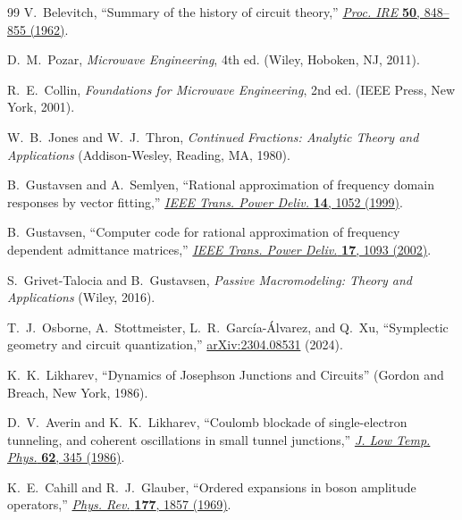 \documentclass[reprint, floatfix, superscriptaddress, amsmath, amssymb, longbibliography]{revtex4-2}
\begin{document}
\begin{thebibliography}{99}
V.~Belevitch,
``Summary of the history of circuit theory,''
\href{https://doi.org/10.1109/PROC.1962.1476}{\textit{Proc. IRE} \textbf{50}, 848--855 (1962)}.

D.~M.~Pozar,
\textit{Microwave Engineering}, 4th ed.
(Wiley, Hoboken, NJ, 2011).

R.~E.~Collin,
\textit{Foundations for Microwave Engineering}, 2nd ed.
(IEEE Press, New York, 2001).

W.~B.~Jones and W.~J.~Thron,
\textit{Continued Fractions: Analytic Theory and Applications}
(Addison-Wesley, Reading, MA, 1980).

B.~Gustavsen and A.~Semlyen, ``Rational approximation of frequency domain responses by vector fitting,'' 
\href{https://doi.org/10.1109/61.772353}{\textit{IEEE Trans. Power Deliv.} \textbf{14}, 1052 (1999)}.

B.~Gustavsen, ``Computer code for rational approximation of frequency dependent admittance matrices,''
\href{https://doi.org/10.1109/61.956770}{\textit{IEEE Trans. Power Deliv.} \textbf{17}, 1093 (2002)}.

S.~Grivet-Talocia and B.~Gustavsen,
\textit{Passive Macromodeling: Theory and Applications}
(Wiley, 2016).

T.~J.~Osborne, A.~Stottmeister, L.~R.~Garc\'{i}a-\'{A}lvarez, and Q.~Xu,
``Symplectic geometry and circuit quantization,''
\href{https://arxiv.org/abs/2304.08531}{arXiv:2304.08531} (2024).

K.~K.~Likharev,
``Dynamics of Josephson Junctions and Circuits''
(Gordon and Breach, New York, 1986).

D.~V.~Averin and K.~K.~Likharev, ``Coulomb blockade of single-electron tunneling, and coherent oscillations in small tunnel junctions,''
\href{https://doi.org/10.1007/BF00683473}{\textit{J. Low Temp. Phys.} \textbf{62}, 345 (1986)}.

K.~E.~Cahill and R.~J.~Glauber, ``Ordered expansions in boson amplitude operators,''
\href{https://doi.org/10.1103/PhysRev.177.1857}{\textit{Phys. Rev.} \textbf{177}, 1857 (1969)}.


\end{thebibliography}
\end{document}
